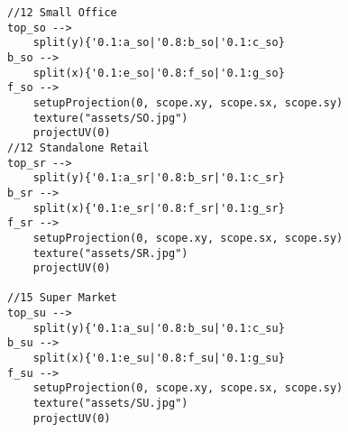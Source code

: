\begin{multicols}{2}
\begin{verbatim}
//12 Small Office
top_so -->
    split(y){'0.1:a_so|'0.8:b_so|'0.1:c_so}
b_so -->
    split(x){'0.1:e_so|'0.8:f_so|'0.1:g_so}
f_so -->
	setupProjection(0, scope.xy, scope.sx, scope.sy)
	texture("assets/SO.jpg")
	projectUV(0)
//12 Standalone Retail
top_sr -->
    split(y){'0.1:a_sr|'0.8:b_sr|'0.1:c_sr}
b_sr -->
    split(x){'0.1:e_sr|'0.8:f_sr|'0.1:g_sr}
f_sr -->
	setupProjection(0, scope.xy, scope.sx, scope.sy)
	texture("assets/SR.jpg")
	projectUV(0)

//15 Super Market
top_su -->
    split(y){'0.1:a_su|'0.8:b_su|'0.1:c_su}
b_su -->
    split(x){'0.1:e_su|'0.8:f_su|'0.1:g_su}
f_su -->
	setupProjection(0, scope.xy, scope.sx, scope.sy)
	texture("assets/SU.jpg")
	projectUV(0)
\end{verbatim}
\end{multicols}